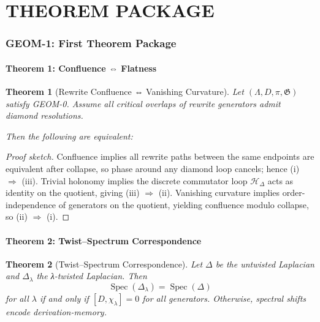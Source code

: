 \documentclass[12pt, oneside]{article}
\newtheorem{theorem}{Theorem}[section]
\DeclareMathOperator{\Spec}{Spec}
\DeclareMathOperator{\Hol}{Hol}
\begin{document}
\part{THEOREM PACKAGE}

\section{GEOM-1: First Theorem Package}

\subsection{Theorem 1: Confluence ⇔ Flatness}

\begin{theorem}[Rewrite Confluence ⇔ Vanishing Curvature]
Let $(\Lambda, D, \pi, \mathfrak{G})$ satisfy GEOM-0. Assume all critical overlaps of rewrite generators admit diamond resolutions.

Then the following are equivalent:
\end{theorem}

\begin{proof}[Proof sketch]
Confluence implies all rewrite paths between the same endpoints are equivalent after collapse, so phase around any diamond loop cancels; hence (i) $\Rightarrow$ (iii). Trivial holonomy implies the discrete commutator loop $\mathcal{H}_\Delta$ acts as identity on the quotient, giving (iii) $\Rightarrow$ (ii). Vanishing curvature implies order-independence of generators on the quotient, yielding confluence modulo collapse, so (ii) $\Rightarrow$ (i).
\end{proof}

\subsection{Theorem 2: Twist–Spectrum Correspondence}

\begin{theorem}[Twist–Spectrum Correspondence]
Let $\Delta$ be the untwisted Laplacian and $\Delta_\lambda$ the λ-twisted Laplacian. Then
\[
\Spec(\Delta_\lambda) = \Spec(\Delta)
\]
for all $\lambda$ if and only if $[D, \chi_\lambda] = 0$ for all generators. Otherwise, spectral shifts encode derivation-memory.
\end{theorem}
\end{document}
